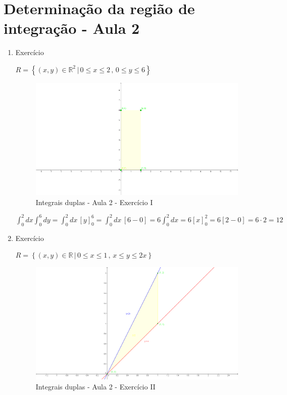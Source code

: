 \documentclass[12pt, a4paper]{article}
\newcommand{\integral}{\displaystyle\int}
\begin{document}
		\section{Determinação da região de integração - Aula 2}		
			\begin{enumerate}
				\item Exercício
				
				$R = \left\{(x, y) \in \mathbb{R}^2 \,|\, 0 \leq x \leq 2 \,,\, 
				0 \leq y \leq 6 \right\}$
				
				\begin{figure}[H]
					\centering
					\includegraphics[width=\textwidth]{v01_a02_e01.png}
					\caption{Integrais duplas - Aula 2 - Exercício I}
					\label{v01_a02_e01}
				\end{figure}
				
				$\integral_0^2 dx \integral_0^6 dy = 
				\integral_0^2 dx\, [y]_0^6 = 
				\integral_0^2 dx\, [6 - 0] = 
				6\integral_0^2 dx = 6[x]_0^2 = 6[2 - 0] = 6 \cdot 2 = 12 $\newline
				
				\item Exercício
				
				$R = \left\{(x, y) \in \mathbb{R} \,|\, 0 \leq x \leq 1 \,,\, 
				x \leq y \leq 2x \right\}$
									
				\begin{figure}[H]
					\centering
					\includegraphics[width=\textwidth]{v01_a02_e02.png}
					\caption{Integrais duplas - Aula 2 - Exercício II}
					\label{v01_a02_e02}
				\end{figure}
				

\end{enumerate}
\end{document}
